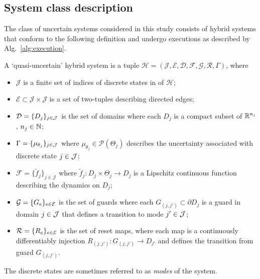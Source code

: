\subsection{System class description}
  The class of uncertain systems considered in this study consists of hybrid systems that conform to the following definition and undergo executions as described by Alg.~\ref{alg:execution}.
\begin{defn}\label{def:system}
  A `quasi-uncertain' hybrid system is a tuple \mbox{$\mathcal H=(\mathcal J,\mathcal E,\mathcal D,\mathcal F,\mathcal G,\mathcal R,\Gamma)$}, where
  \begin{itemize}
    \item $\mathcal J$ is a finite set of indices of discrete states in of $\mathcal H$;
    \item $\mathcal E\subset \mathcal J\times \mathcal J$ is a set of two-tuples describing directed edges;
    \item $\mathcal D = \{D_j\}_{j \in {\cal J}}$ is the set of domains where each $D_j$ is a compact subset of $\mathbb{R}^{n_j}$, $n_j \in \mathbb{N}$;
    \item $\Gamma = \{\mu_{\theta_j} \}_{j \in {\cal J}}$ where $\mu_{\theta_j}\in \mathcal P(\Theta_j)$ describes the uncertainty associated with discrete state $j \in {\cal J}$;
    \item $\mathcal F=\{\tilde f_j\}_{j\in \mathcal J}$ where $\tilde{f}_j: D_j \times \Theta_j \to D_j$ is a Lipschitz continuous function describing the dynamics on $D_j$;
    \item $\mathcal G=\{G_e\}_{e \in {\cal E}}$ is the set of guards where each $G_{(j,j')} \subset \partial D_j$ is a guard in domain $j \in {\cal J}$ that defines a transition to mode $j' \in {\cal J}$;
    \item $\mathcal R = \{R_e\}_{e \in {\cal E}}$ is the set of reset maps, where each map is a continuously differentiably injection $R_{(j,j')}: G_{(j,j')} \to D_{j'}$ and defines the transition from guard $G_{(j,j')}$.
  \end{itemize}
\end{defn}
\noindent The discrete states are sometimes referred to as {\em modes} of the system.

